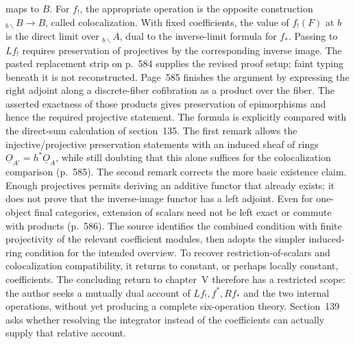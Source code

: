\documentclass[10pt,oneside]{book}
\begin{document}
maps to $B$. For $f_!$, the appropriate operation is the opposite construction ${}_{b\backslash}B\to B$, called colocalization. With fixed coefficients, the value of $f_!(F)$ at $b$ is the direct limit over ${}_{b\backslash}A$, dual to the inverse-limit formula for $f_*$. Passing to $Lf_!$ requires preservation of projectives by the corresponding inverse image. The pasted replacement strip on p.~584 supplies the revised proof setup; faint typing beneath it is not reconstructed. Page~585 finishes the argument by expressing the right adjoint along a discrete-fiber cofibration as a product over the fiber. The asserted exactness of those products gives preservation of epimorphisms and hence the required projective statement. The formula is explicitly compared with the direct-sum calculation of section~135. The first remark allows the injective/projective preservation statements with an induced sheaf of rings $\underline O_{A'}=h^*\underline O_A$, while still doubting that this alone suffices for the colocalization comparison (p.~585). The second remark corrects the more basic existence claim. Enough projectives permits deriving an additive functor that already exists; it does not prove that the inverse-image functor has a left adjoint. Even for one-object final categories, extension of scalars need not be left exact or commute with products (p.~586). The source identifies the combined condition with finite projectivity of the relevant coefficient modules, then adopts the simpler induced-ring condition for the intended overview. To recover restriction-of-scalars and colocalization compatibility, it returns to constant, or perhaps locally constant, coefficients. The concluding return to chapter~V therefore has a restricted scope: the author seeks a mutually dual account of $Lf_!,f^*,Rf_*$ and the two internal operations, without yet producing a complete six-operation theory. Section~139 asks whether resolving the integrator instead of the coefficients can actually supply that relative account.
\end{document}
